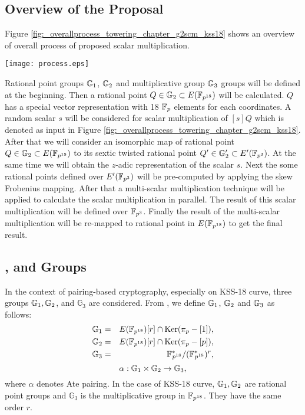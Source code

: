\subsection{Overview of the Proposal} 
Figure \ref{fig:_overallprocess_towering_chapter_g2scm_kss18} shows an overview of overall process of proposed scalar multiplication.
\begin{figure*}[ht]
\centering
	\texttt{[image: process.eps]}
\caption{Overview of the proposed scalar multiplication for KSS-18 Curve.}
\label{fig:_overallprocess_towering_chapter_g2scm_kss18}
\end{figure*}
Rational point groups ${\mathbb{G}}_{1}$, ${\mathbb{G}}_{2}$ and multiplicative group ${\mathbb{G}}_{3}$ groups will be defined at the beginning. Then a rational point $Q\in {\mathbb{G}}_{2} \subset E({\mathbb{F}}_{p^{18}})$ will be calculated.
$Q$ has a  special vector representation with 18 ${\mathbb{F}}_{p}$ elements for each coordinates. 
A random scalar $s$ will be considered for scalar multiplication of $[s]Q$ which is denoted as input in  Figure \ref{fig:_overallprocess_towering_chapter_g2scm_kss18}. After that we will consider an isomorphic map of rational point $Q\in {\mathbb{G}}_{2} \subset E({\mathbb{F}}_{p^{18}})$ to its sextic twisted rational point $Q' \in {\mathbb{G}}_{2}' \subset E'({\mathbb{F}}_{p^{3}})$. At the same time we will obtain the $z$-adic  representation of the scalar $s$. Next the some rational points defined over $E'(\mathbb{F}_{p^3})$ will be pre-computed by applying the skew Frobenius mapping. After that a multi-scalar multiplication technique will be applied to calculate the scalar multiplication in parallel. The result of this scalar multiplication will be defined over $\mathbb{F}_{p^3}$. Finally the result of the multi-scalar multiplication will be re-mapped to rational point in $E(\mathbb{F}_{p^{18}})$ to get the final result.

\subsection{,  and  Groups} 
In the context of pairing-based cryptography, especially on KSS-18 curve, three groups ${\mathbb{G}}_{1}, {\mathbb{G}}_{2}$, and $\mathbb{G}_3$ are considered. From \cite{PAIRING:MANS13}, we define ${\mathbb{G}}_{1}$, ${\mathbb{G}}_{2}$ and ${\mathbb{G}}_{3}$ as follows:
\begin{eqnarray}\label{eq:g1_chapter_g2scm_kss18}
{\mathbb{G}}_{1} & = &  E({\mathbb{F}}_{p^{18}}) [r] \cap \text{Ker}(\pi_p - [1]), \nonumber \\
{\mathbb{G}}_{2} & = &  E({\mathbb{F}}_{p^{18}}) [r] \cap \text{Ker}(\pi_p - [p]), \nonumber \\
{\mathbb{G}}_{3} & = & {{\mathbb{F}}^{\ast}}_{\!\!\!p^{18}}/({{\mathbb{F}}^{\ast}}_{\!\!\!p^{18}})^r, \nonumber
\end{eqnarray}
\begin{equation}
\alpha : {\mathbb{G}}_{1} \times {\mathbb{G}}_{2} \rightarrow {\mathbb{G}}_{3},
\end{equation}
where $\alpha$ denotes Ate pairing. In the case of KSS-18 curve, ${\mathbb{G}}_{1}, {\mathbb{G}}_{2}$ are rational point groups and $\mathbb{G}_3$ is the multiplicative group in $\mathbb{F}_{p^{18}}$. They have the same order $r$. 

